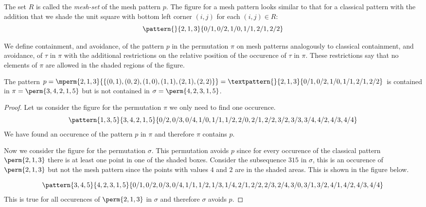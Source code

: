 The set \(R\) is called the \emph{mesh-set} of the mesh pattern \(p\).
The figure for a mesh pattern looks similar to that for a classical pattern with the
addition that we shade the unit square with bottom left corner \((i,j)\) for each \((i,j) \in R\):
\begin{equation*}
    \pattern{}{ 2, 1, 3 }{ 0/1, 0/2, 1/0, 1/1, 2/1, 2/2 }
\end{equation*}

We define containment, and avoidance, of the pattern \(p\) in the permutation
\(\pi\) on mesh patterns analogously to classical containment, and avoidance,
of \(\tau\) in \(\pi\) with the additional restrictions on the relative
position of the occurence of \(\tau\) in \(\pi\). These restrictions say that
no elements of \(\pi\) are allowed in the shaded regions of the figure.

\begin{example}
    The pattern \(p=\mperm{2,1,3}{\{(0,1),(0,2),(1,0),(1,1),(2,1),(2,2)\}}=
    \textpattern{}{ 2, 1, 3 }{ 0/1, 0/2, 1/0, 1/1, 2/1, 2/2 }\) is contained in
    \(\pi = \perm{3,4,2,1,5}\) but is not contained in \(\sigma = \perm{4,2,3,1,5}\).
\end{example}
\begin{proof}
    Let us consider the figure for the permutation \(\pi\) we only need to find one occurence.
    \begin{equation*}
        \pattern{1,3,5}{3,4,2,1,5}{0/2,0/3,0/4,
                                   1/0,1/1,1/2,
                                   2/0,2/1,2/2,
                                   3/2,3/3,3/4,
                                   4/2,4/3,4/4}
    \end{equation*}
    We have found an occurence of the pattern \(p\) in \(\pi\) and therefore
    \(\pi\) contains \(p\).

    Now we consider the figure for the permutation \(\sigma\). This permutation
    avoids \(p\) since for every occurence of the classical pattern \(\perm{2,1,3}\)
    there is at least one point in one of the shaded boxes. Consider the subsequence
    \(315\) in \(\sigma\), this is an occurence of \(\perm{2,1,3}\) but not the mesh
    pattern since the points with values \(4\) and \(2\) are in the shaded areas.
    This is shown in the figure below.

    \begin{equation*}
        \pattern{3,4,5}{4,2,3,1,5}{0/1,0/2,0/3,0/4,
                                   1/1,1/2,1/3,1/4,
                                   2/1,2/2,2/3,2/4,
                                   3/0,3/1,3/2,
                                   4/1,4/2,4/3,4/4}
    \end{equation*}
    This is true for all occurences of \(\perm{2,1,3}\) in \(\sigma\) and
    therefore \(\sigma\) avoids \(p\).
\end{proof}

